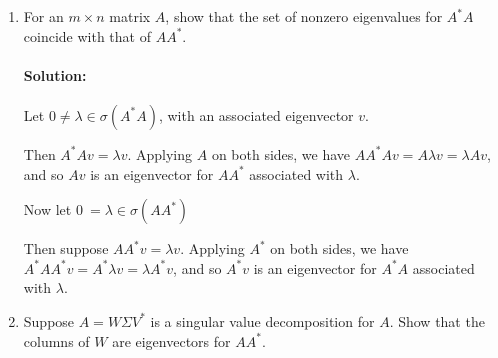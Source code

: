\documentclass{article}
\begin{document}
\begin{enumerate}

\item For an $m \times  n$ matrix $A$, show that the set of nonzero eigenvalues for $A^*  A$ coincide with that of $AA^* $.
    \paragraph{Solution: }Let $0\neq \lambda\in \sigma(A^* A)$, with an associated eigenvector $v$.

    Then $A^* Av=\lambda v$. Applying $A$ on both sides, we have $A A^*  Av=A\lambda v=\lambda Av$, and so $Av$ is an eigenvector for $A A^* $ associated with $\lambda$.

    Now let $0~=\lambda\in \sigma(A A^* )$

    Then suppose $A A^*v=\lambda v$. Applying $A^* $ on both sides, we have $A ^*A  A^* v=A^* \lambda v=\lambda A^* v$, and so $A^*v$ is an eigenvector for $A ^*A$ associated with $\lambda$.

\item Suppose $A = W \Sigma V^* $ is a singular value decomposition for $A$. Show that the columns of $W$ are eigenvectors for $AA^* $.

\end{enumerate}
\end{document}

